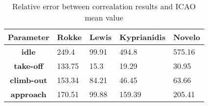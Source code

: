 \begin{table}[h!]
  \centering
  \begin{tabularx}{\textwidth}{||c|X|X|X|X||}
  \hline
    \cellcolor{gray!20}\textbf{Parameter} & \cellcolor{gray!20}\textbf{Rokke} & \cellcolor{gray!20}\textbf{Lewis} & \cellcolor{gray!20}\textbf{Kyprianidis} & \cellcolor{gray!20}\textbf{Novelo} \\ [0.5ex]
  \hline\hline
\centering
    \cellcolor{gray!20}\textbf{idle} & 249.4 & 99.91 & 494.8 & 575.16 \\
  \hline
    \cellcolor{gray!20}\textbf{take-off} & 133.75 & 15.3 & 19.29 & 30.95 \\
  \hline
    \cellcolor{gray!20}\textbf{climb-out} & 153.34 & 84.21 & 46.45 & 63.66 \\
  \hline
    \cellcolor{gray!20}\textbf{approach} & 170.51 & 99.88 & 159.39 & 205.41 \\
  \hline
  \end{tabularx}
  \caption{Relative error between correalation results and ICAO mean value}
  \label{tab:relec}
\end{table}
